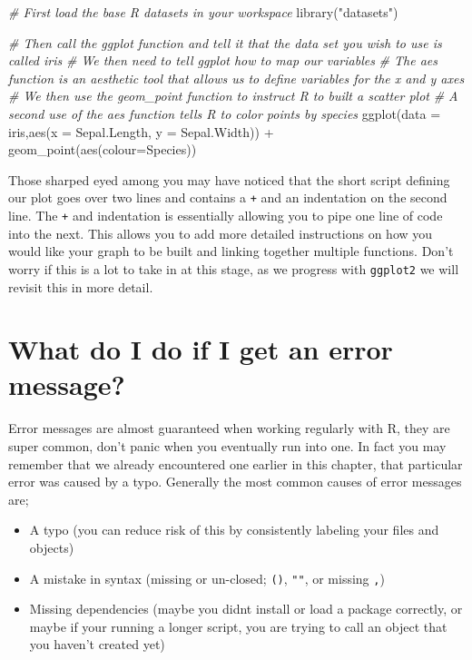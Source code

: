 \documentclass[
]{book}
\newenvironment{Shaded}{\begin{snugshade}}{\end{snugshade}}
\newcommand{\AttributeTok}[1]{\textcolor[rgb]{0.77,0.63,0.00}{#1}}
\newcommand{\CommentTok}[1]{\textcolor[rgb]{0.56,0.35,0.01}{\textit{#1}}}
\newcommand{\FunctionTok}[1]{\textcolor[rgb]{0.00,0.00,0.00}{#1}}
\newcommand{\NormalTok}[1]{#1}
\newcommand{\SpecialCharTok}[1]{\textcolor[rgb]{0.00,0.00,0.00}{#1}}
\newcommand{\StringTok}[1]{\textcolor[rgb]{0.31,0.60,0.02}{#1}}
\providecommand{\tightlist}{%
  \setlength{\itemsep}{0pt}\setlength{\parskip}{0pt}}
\begin{document}
\begin{Shaded}
\begin{Highlighting}[]
\CommentTok{\# First load the base R datasets in your workspace}
\FunctionTok{library}\NormalTok{(}\StringTok{"datasets"}\NormalTok{)}

\CommentTok{\# Then call the ggplot function and tell it that the data set you wish to use is called iris}
\CommentTok{\# We then need to tell ggplot how to map our variables}
\CommentTok{\# The aes function is an aesthetic tool that allows us to define variables for the x and y axes}
\CommentTok{\# We then use the geom\_point function to instruct R to built a scatter plot}
\CommentTok{\# A second use of the aes function tells R to color points by species}
\FunctionTok{ggplot}\NormalTok{(}\AttributeTok{data =}\NormalTok{ iris,}\FunctionTok{aes}\NormalTok{(}\AttributeTok{x =}\NormalTok{ Sepal.Length, }\AttributeTok{y =}\NormalTok{ Sepal.Width)) }\SpecialCharTok{+} 
  \FunctionTok{geom\_point}\NormalTok{(}\FunctionTok{aes}\NormalTok{(}\AttributeTok{colour=}\NormalTok{Species)) }
\end{Highlighting}
\end{Shaded}

Those sharped eyed among you may have noticed that the short script defining our plot goes over two lines and contains a \texttt{+} and an indentation on the second line. The \texttt{+} and indentation is essentially allowing you to pipe one line of code into the next. This allows you to add more detailed instructions on how you would like your graph to be built and linking together multiple functions. Don't worry if this is a lot to take in at this stage, as we progress with \texttt{ggplot2} we will revisit this in more detail.

\hypertarget{what-do-i-do-if-i-get-an-error-message}{%
\section{What do I do if I get an error message?}\label{what-do-i-do-if-i-get-an-error-message}}

Error messages are almost guaranteed when working regularly with R, they are super common, don't panic when you eventually run into one. In fact you may remember that we already encountered one earlier in this chapter, that particular error was caused by a typo. Generally the most common causes of error messages are;

\begin{itemize}
\tightlist
\item
  A typo (you can reduce risk of this by consistently labeling your files and objects)
\item
  A mistake in syntax (missing or un-closed; \texttt{()}, \texttt{""}, or missing \texttt{,})
\item
  Missing dependencies (maybe you didnt install or load a package correctly, or maybe if your running a longer script, you are trying to call an object that you haven't created yet)
\end{itemize}
\end{document}
